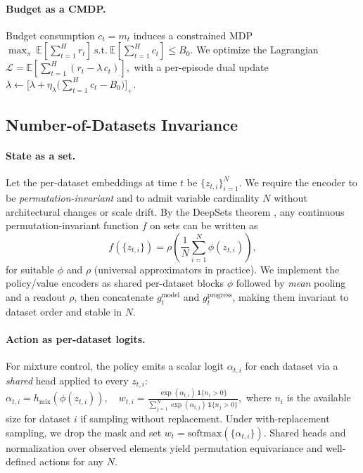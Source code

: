 \documentclass[11pt]{article}
\newcommand{\E}{\mathbb{E}}
\newcommand{\1}{\mathbf{1}}
\begin{document}
\paragraph{Budget as a CMDP.}
Budget consumption $c_t=m_t$ induces a constrained MDP
\(
\max_\pi \ \E[\sum_{t=1}^H r_t]\ \text{s.t.}\ \E[\sum_{t=1}^H c_t]\le B_0.
\)
We optimize the Lagrangian
\(
\mathcal{L}=\E\!\left[\sum_{t=1}^H (r_t-\lambda\,c_t)\right],
\)
with a per-episode dual update
\(
\lambda \leftarrow \big[\lambda + \eta_\lambda\big(\sum_{t=1}^H c_t - B_0\big)\big]_+.
\)

\subsection{Number-of-Datasets Invariance}\label{sec:invariance}
\paragraph{State as a set.}
Let the per-dataset embeddings at time $t$ be $\{z_{t,i}\}_{i=1}^N$.
We require the encoder to be \emph{permutation-invariant} and to admit variable cardinality $N$ without architectural changes or scale drift.
By the DeepSets theorem \citep{zaheer2017deepsets}, any continuous permutation-invariant function $f$ on sets can be written as
\begin{equation}
f(\{z_{t,i}\})=\rho\!\left(\frac{1}{N}\sum_{i=1}^N \phi(z_{t,i})\right),
\label{eq:deepsets}
\end{equation}
for suitable $\phi$ and $\rho$ (universal approximators in practice).
We implement the policy/value encoders as shared per-dataset blocks $\phi$ followed by \emph{mean} pooling and a readout $\rho$, then concatenate $g^{\text{model}}_t$ and $g^{\text{progress}}_t$, making them invariant to dataset order and stable in $N$.

\paragraph{Action as per-dataset logits.}
For mixture control, the policy emits a scalar logit $\alpha_{t,i}$ for each dataset via a \emph{shared} head applied to every $z_{t,i}$:
\(
\alpha_{t,i} = h_{\text{mix}}(\phi(z_{t,i})),\quad
w_{t,i}=\frac{\exp(\alpha_{t,i})\,\1\{n_i>0\}}{\sum_{j=1}^N \exp(\alpha_{t,j})\,\1\{n_j>0\}},
\)
where $n_i$ is the available size for dataset $i$ if sampling without replacement. Under with-replacement sampling,
we drop the mask and set $w_t=\mathrm{softmax}(\{\alpha_{t,i}\})$. Shared heads and normalization over observed elements yield permutation equivariance and well-defined actions for any $N$.
\end{document}
